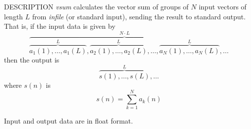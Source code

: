 % 
% 
% 
% 
%                                                                        
%

\begin{synopsis}
\item[vsum] [ --l $L$ ] [ --n $N$ ] [ {\em infile} ]
\end{synopsis}

\begin{qsection}{DESCRIPTION}
{\em vsum} calculates the vector sum of groups of $N$ input vectors 
of length $L$ from {\em infile} (or standard input), 
sending the result to standard output.
That is, if the input data is given by
\begin{displaymath}
\overbrace{
  \overbrace{a_1(1),\ldots,a_1(L)}^{L},
  \overbrace{a_2(1),\ldots,a_2(L)}^{L},\ldots,
  \overbrace{a_N(1),\ldots,a_N(L)}^{L}
}^{N \cdot L},\ldots
\end{displaymath}
then the output is 
\begin{displaymath}
  \overbrace{s(1),\ldots,s(L)}^{L},\ldots
\end{displaymath}
where $s(n)$ is
\begin{displaymath}
  s(n)=\sum_{k=1}^{N} a_k(n)
\end{displaymath}

Input and output data are in float format.
\end{qsection}

